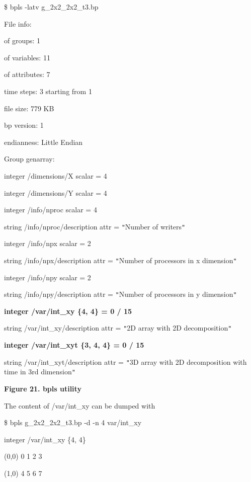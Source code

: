 \$ bpls -latv g\_2x2\_2x2\_t3.bp

File info:

\parindent=7pt
of groups:     1

of variables:  11

of attributes: 7

time steps:    3 starting from 1

file size:     779 KB

bp version:    1

endianness:    Little Endian

\parindent=0pt
Group genarray:

\parindent=7pt
integer    /dimensions/X             scalar = 4 

integer    /dimensions/Y             scalar = 4 

integer    /info/nproc               scalar = 4 

string     /info/nproc/description   attr   = \texttt{"}Number of writers\texttt{"}

integer    /info/npx                 scalar = 2 

string     /info/npx/description     attr   = \texttt{"}Number of processors in 
x dimension\texttt{"}

integer    /info/npy                 scalar = 2 

string     /info/npy/description     attr   = \texttt{"}Number of processors in 
y dimension\texttt{"}

\textbf{integer    /var/int\_xy               \{4, 4\} = 0 / 15 }

string     /var/int\_xy/description   attr   = \texttt{"}2D array with 2D decomposition\texttt{"}

\textbf{integer    /var/int\_xyt              \{3, 4, 4\} = 0 / 15 }

string     /var/int\_xyt/description  attr   = \texttt{"}3D array with 2D decomposition 
with time in 3rd dimension\texttt{"}

\label{HToc144350180}

\leftskip=18pt
\parindent=0pt
{\color{color20} \textbf{Figure 21. bpls utility}}

\leftskip=0pt
The content of /var/int\_xy can be dumped with

\$ bpls  g\_2x2\_2x2\_t3.bp -d -n 4 var/int\_xy

\parindent=7pt
integer    /var/int\_xy    \{4, 4\}

\parindent=14pt
(0,0)    0 1 2 3 

(1,0)    4 5 6 7 

